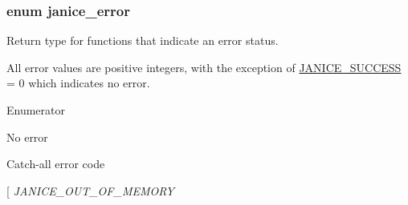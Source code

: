 \subsubsection[{janice\+\_\+error}]{\setlength{\rightskip}{0pt plus 5cm}enum {\bf janice\+\_\+error}}\label{group__janice_ga4873d49c1f9d6a6880dfbd485cf6ba72}


Return type for functions that indicate an error status. 

All error values are positive integers, with the exception of \hyperlink{group__janice_gga4873d49c1f9d6a6880dfbd485cf6ba72a7cd6c7d28583c2dfa4e19f8642a60f3e}{J\+A\+N\+I\+C\+E\+\_\+\+S\+U\+C\+C\+E\+S\+S} = 0 which indicates no error. \begin{Desc}
\item[Enumerator]\par
\begin{description}
\item[{\em 
\hypertarget{group__janice_gga4873d49c1f9d6a6880dfbd485cf6ba72a7cd6c7d28583c2dfa4e19f8642a60f3e}{}J\+A\+N\+I\+C\+E\+\_\+\+S\+U\+C\+C\+E\+S\+S\label{group__janice_gga4873d49c1f9d6a6880dfbd485cf6ba72a7cd6c7d28583c2dfa4e19f8642a60f3e}
}]No error \item[{\em 
\hypertarget{group__janice_gga4873d49c1f9d6a6880dfbd485cf6ba72a418184f1d074e5bbed409836b69c78f5}{}J\+A\+N\+I\+C\+E\+\_\+\+U\+N\+K\+N\+O\+W\+N\+\_\+\+E\+R\+R\+O\+R\label{group__janice_gga4873d49c1f9d6a6880dfbd485cf6ba72a418184f1d074e5bbed409836b69c78f5}
}]Catch-\/all error code \item[{\em 
\hypertarget{group__janice_gga4873d49c1f9d6a6880dfbd485cf6ba72a8f69ad2b7599334e67aecc936721abfa}{}J\+A\+N\+I\+C\+E\+\_\+\+O\+U\+T\+\_\+\+O\+F\+\_\+\+M\+E\+M\+O\+R\+Y\label{group__janice_gga4873d49c1f9d6a6880dfbd485cf6ba72a8f69ad2b7599334e67aecc936721abfa}
}
\end{description}
\end{Desc}
